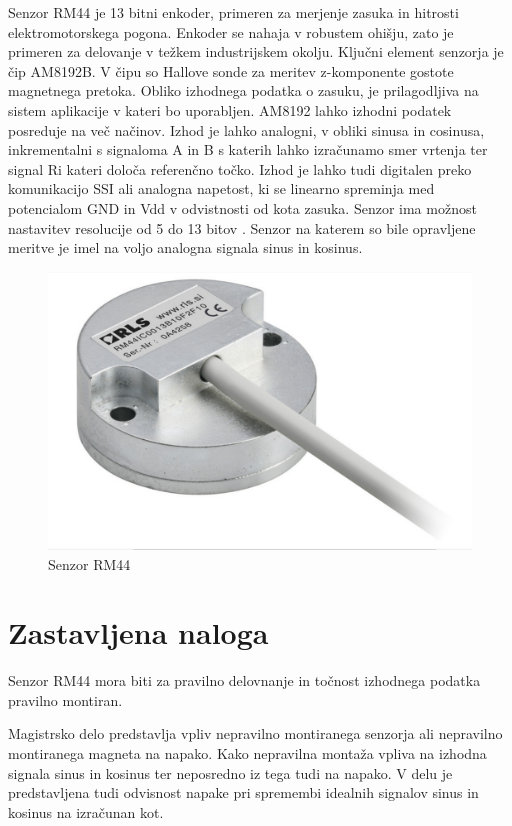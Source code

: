 Senzor RM44 je 13 bitni enkoder, primeren za merjenje zasuka in hitrosti elektromotorskega pogona.
Enkoder se nahaja v robustem ohišju, zato je primeren za delovanje v težkem industrijskem okolju.%
Ključni element senzorja je čip AM8192B. V čipu so Hallove sonde za meritev z-komponente gostote magnetnega pretoka. Obliko izhodnega podatka o zasuku, je prilagodljiva na sistem aplikacije v kateri bo uporabljen. AM8192 lahko izhodni podatek posreduje na več načinov. Izhod je lahko analogni, v obliki sinusa in cosinusa, inkrementalni s signaloma A in B s katerih lahko izračunamo smer vrtenja ter signal Ri kateri določa referenčno točko. Izhod je lahko tudi digitalen preko komunikacijo SSI ali analogna napetost, ki se linearno spreminja med potencialom GND in Vdd v odvistnosti od kota zasuka. Senzor ima možnost nastavitev resolucije od 5 do 13 bitov \cite{RM44}\cite{AM8192}. Senzor na katerem so bile opravljene meritve je imel na voljo analogna signala sinus in kosinus.

\begin{figure}[h]
	\centering
	\includegraphics[width=0.5\columnwidth]{./Slike/senzorRM44.jpg}
	\caption{Senzor RM44}
	\label{RM44}
\end{figure}



\chapter{Zastavljena naloga}

Senzor RM44 mora biti za pravilno delovnanje in točnost izhodnega podatka pravilno montiran.%

Magistrsko delo predstavlja vpliv nepravilno montiranega senzorja ali nepravilno montiranega magneta na napako. Kako nepravilna montaža vpliva na izhodna signala sinus in kosinus ter neposredno iz tega tudi na napako. V delu je predstavljena tudi odvisnost napake pri spremembi idealnih signalov sinus in kosinus na izračunan kot.

